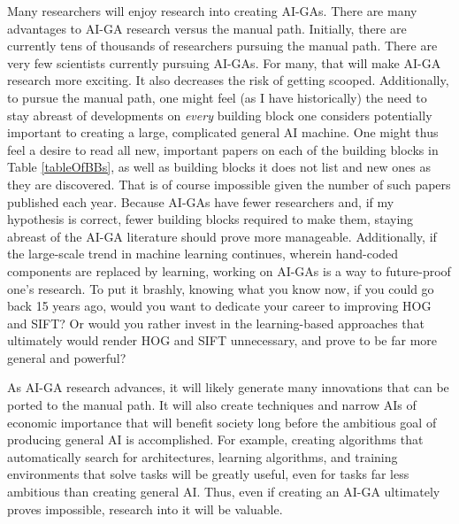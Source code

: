 \documentclass{article}
\begin{document}
Many researchers will enjoy research into creating AI-GAs. There are many advantages to AI-GA research versus the manual path. Initially, there are currently tens of thousands of researchers pursuing the manual path. There are very few scientists currently pursuing AI-GAs. For many, that will make AI-GA research more exciting. It also decreases the risk of getting scooped. Additionally, to pursue the manual path, one might feel (as I have historically) the need to stay abreast of developments on \emph{every} building block one considers potentially important to creating a large, complicated general AI machine. One might thus feel a desire to read all new, important papers on each of the building blocks in Table \ref{tableOfBBs}, as well as building blocks it does not list and new ones as they are discovered. That is of course impossible given the number of such papers published each year. Because AI-GAs have fewer researchers and, if my hypothesis is correct, fewer building blocks required to make them, staying abreast of the AI-GA literature should prove more manageable. Additionally, if the large-scale trend in machine learning continues, wherein hand-coded components are replaced by learning, working on AI-GAs is a way to future-proof one's research. To put it brashly, knowing what you  know now, if you could go back 15 years ago, would you want to dedicate your career to improving HOG and SIFT? Or would you rather invest in the learning-based approaches that ultimately would render HOG and SIFT unnecessary, and prove to be far more general and powerful? 

As AI-GA research advances, it will likely generate many innovations that can be ported to the manual path. It will also create techniques and narrow AIs of economic importance that will benefit society long before the ambitious goal of producing general AI is accomplished. For example, creating algorithms that automatically search for architectures, learning algorithms, and training environments that solve tasks will be greatly useful, even for tasks far less ambitious than creating general AI. Thus, even if creating an AI-GA ultimately proves impossible, research into it will be valuable. 
\end{document}
